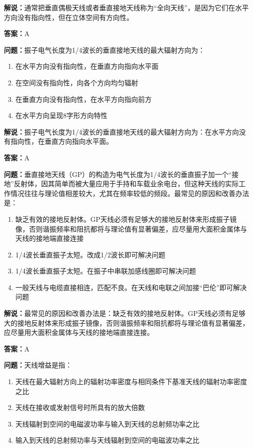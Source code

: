 \documentclass[UTF8]{ctexbook}
\begin{document}
\textbf{解说：}通常把垂直偶极天线或者垂直接地天线称为“全向天线”，是因为它们在水平方向没有指向性，但在立体空间有方向性。%

\textbf{答案：}A

\textbf{问题：}振子电气长度为1/4波长的垂直接地天线的最大辐射方向为：

\begin{enumerate}[label=\Alph*), leftmargin=3em]
  \item 在水平方向没有指向性，在垂直方向指向水平面
  \item 在空间没有指向性，向各个方向均匀辐射
  \item 在垂直方向没有指向性，在水平方向指向前方
  \item 在水平方向呈现8字形方向特性
\end{enumerate}

\textbf{解说：}振子电气长度为1/4波长的垂直接地天线的最大辐射方向为：在水平方向没有指向性，在垂直方向指向水平面。%

\textbf{答案：}A

\textbf{问题：}垂直接地天线（GP）的构造为电气长度为1/4波长的垂直振子加一个“接地”反射体，因其简单而被大量应用于手持和车载业余电台，但这种天线的实际工作情况往往与理论值相差较大，尤其在频率较低的频段。最常见的原因和改善办法是：

\begin{enumerate}[label=\Alph*), leftmargin=3em]
  \item 缺乏有效的接地反射体。GP天线必须有足够大的接地反射体来形成振子镜像，否则谐振频率和阻抗都将与理论值有显著偏差，应尽量用大面积金属体与天线的接地端直接连接
  \item 1/4波长垂直振子太短。改成1/2波长即可解决问题
  \item 1/4波长垂直振子太短。在振子中串联加感线圈即可解决问题
  \item 一般天线与电缆直接相连，匹配不良。在天线和电联之间加接“巴伦”即可解决问题
\end{enumerate}

\textbf{解说：}最常见的原因和改善办法是：缺乏有效的接地反射体。GP天线必须有足够大的接地反射体来形成振子镜像，否则谐振频率和阻抗都将与理论值有显著偏差，应尽量用大面积金属体与天线的接地端直接连接。%

\textbf{答案：}A

\textbf{问题：}天线增益是指：

\begin{enumerate}[label=\Alph*), leftmargin=3em]
  \item 天线在最大辐射方向上的辐射功率密度与相同条件下基准天线的辐射功率密度之比
  \item 天线在接收或发射信号时所具有的放大倍数
  \item 天线辐射到空间的电磁波功率与输入到天线的总射频功率之比
  \item 输入到天线的总射频功率与天线辐射到空间的电磁波功率之比
\end{enumerate}
\end{document}
